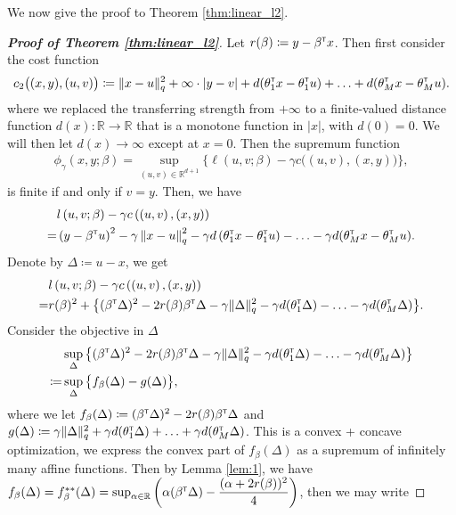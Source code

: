 \documentclass[12pt]{article}
\begin{document}
We now give the proof to Theorem \ref{thm:linear_l2}.
\begin{proof}[\textbf{Proof of Theorem \ref{thm:linear_l2}}]
    Let $r(\beta) \coloneqq y - \beta^{\scriptscriptstyle \sf T} x$. Then first consider the cost function\[
    c_2\big((x,y),(u,v)\big) \coloneqq \Vert x-u\Vert_q^2 + \infty\cdot|y-v| +  d(\theta_1^{\scriptscriptstyle \sf T} x - \theta_1^{\scriptscriptstyle \sf T} u) + \ldots +  d(\theta_M^{\scriptscriptstyle \sf T} x - \theta_M^{\scriptscriptstyle \sf T} u).
    \]where we replaced the transferring strength from $+\infty$ to a finite-valued distance function $d(x):\mathbb{R}\to\mathbb{R}$ that is a monotone function in $|x|$, with $d(0)=0$. We will then let $d(x) \to \infty$ except at $x=0$. Then the supremum function \begin{align*}
        \phi_\gamma(x,y;\beta) = 
        \sup_{(u,v)\in \mathbb{R}^{d+1}} \big\{ \ell(u,v;\beta) - \gamma c\big((u,v),(x,y) \big)\big\},
    \end{align*}is finite if and only if $v = y$. Then, we have\begin{align*}
        &l\left( u,v;\beta \right) -\gamma c\left( \left( u,v\right) ,(x,y\right)
) \\
=&\left(y-\beta^{\scriptscriptstyle \sf T} u\right) ^{2}-\gamma \left\Vert x-u\right\Vert
_{q}^{2}-\gamma d\left( \theta_1^{\scriptscriptstyle \sf T} x-\theta_1^{\scriptscriptstyle \sf T} u\right)  - \ldots - \gamma d(\theta_M^{\scriptscriptstyle \sf T} x - \theta_M^{\scriptscriptstyle \sf T} u).
    \end{align*}Denote by $\Delta \coloneqq u-x$, we get
\begin{align*}
    &l\left( u,v;\beta \right) -\gamma c\left( \left( u,v\right) ,(x,y\right)) \\
    =&r(\beta)^2 + \big\{(\beta^{\scriptscriptstyle \sf T} \Delta)^2 - 2r(\beta)\beta^{\scriptscriptstyle \sf T}\Delta - \gamma\Vert\Delta\Vert_q^2 - \gamma d(\theta_1^{\scriptscriptstyle \sf T}\Delta) - \ldots-\gamma d(\theta_M^{\scriptscriptstyle \sf T} \Delta) \big\}.
\end{align*}
Consider the objective in $\Delta$ \begin{align*}
    &\sup_{\Delta} \big\{(\beta^{\scriptscriptstyle \sf T} \Delta)^2 - 2r(\beta)\beta^{\scriptscriptstyle \sf T}\Delta - \gamma\Vert\Delta\Vert_q^2 - \gamma d(\theta_1^{\scriptscriptstyle \sf T}\Delta) - \ldots-\gamma d(\theta_M^{\scriptscriptstyle \sf T} \Delta) \big\}\\
    \coloneqq &\sup_{\Delta} \big\{ f_\beta(\Delta) - g(\Delta)\big\},
\end{align*}
where we let $f_\beta(\Delta)\coloneqq (\beta^{\scriptscriptstyle \sf T} \Delta)^2 - 2r(\beta)\beta^{\scriptscriptstyle \sf T}\Delta$ and $g(\Delta) \coloneqq\gamma\Vert\Delta\Vert_q^2 + \gamma d(\theta_1^{\scriptscriptstyle \sf T}\Delta) + \ldots +\gamma d(\theta_M^{\scriptscriptstyle \sf T} \Delta)$. This is a convex + concave optimization, we express the convex part of $f_\beta(\Delta)$ as a supremum of infinitely many affine functions. Then by Lemma \ref{lem:1}, we have $f_\beta(\Delta) = f_\beta^{**}(\Delta) = \sup_{\alpha\in \mathbb{R}} \left(\alpha (\beta^{\scriptscriptstyle \sf T}\Delta) - \dfrac{(\alpha+2r(\beta))^2}{4}\right)$, then we may write 

\end{proof}
\end{document}
